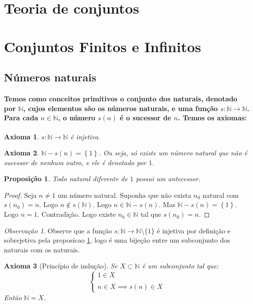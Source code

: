\documentclass{article}
\theoremstyle{plain}
\newtheorem{axioma}{Axioma}
\newtheorem{prop}{Proposição}
\theoremstyle{definition}
\theoremstyle{remark}
\newtheorem{obs}{Observação}[section]
\begin{document}
\section{Teoria de conjuntos}
\section{Conjuntos Finitos e Infinitos}
\subsection{Números naturais}
\paragraph{Temos como conceitos primitivos o conjunto dos naturais, denotado por $\mathbb{N}$, cujos elementos são os números naturais, e uma função $s:\mathbb{N} \to \mathbb{N}$. Para cada $n\in \mathbb{N}$, o número $s(n)$ é o sucessor de $n$.  Temos os axiomas:}
\begin{axioma}
	$s:\mathbb{N} \to \mathbb{N}$ é injetiva.
\end{axioma}
\begin{axioma}
	$\mathbb{N} - s(n) = \left\{ 1 \right\}$. Ou seja, só existe um número natural que não é sucessor de nenhum outro, e ele é denotado por $1$.
\end{axioma}
\begin{prop}
	\label{propsuc}
	Todo natural diferente de $1$ possui um antecessor.
\end{prop}
\begin{proof}
	Seja $n\neq 1$ um número natural. Suponha que não exista $n_0$ natural com $s(n_0) = n$. Logo $n \not \in s\left(\mathbb{N}\right)$. Logo $n\in \mathbb{N} - s(n)$. Mas $\mathbb{N} - s(n) = \left\{ 1 \right\}$. Logo $n = 1$. Contradição. Logo existe  $n_0\in \mathbb{N}$ tal que $s(n_0) = n$.
\end{proof}
\begin{obs}
	Observe que a função $s: \mathbb{N} \to \mathbb{N}\setminus \{1\}$ é injetiva por definição e sobrejetiva pela proposicao \ref{propsuc}, logo é uma bijeção entre um subconjunto dos naturais com os naturais.
\end{obs}
\begin{axioma}[Princípio de indução]
	Se $X\subset \mathbb{N}$ é  um subconjunto tal que: 
	$$
	\begin{cases}
		1 \in X\\~\\
		n \in X \implies s(n) \in X
	\end{cases}
	$$
	Então $\mathbb{N} = X$.
\end{axioma}
\end{document}
